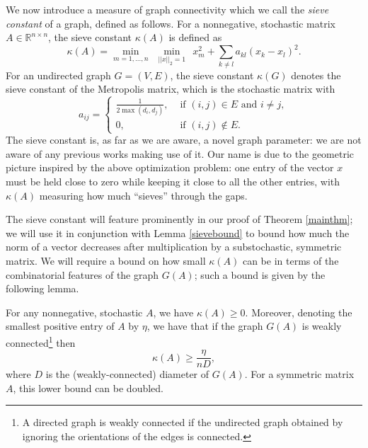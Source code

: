 \documentclass[final]{siamltex}
\begin{document}
\bigskip We now introduce a measure of graph connectivity which we call the {\em sieve constant} of a graph, defined as follows. For a nonnegative, stochastic matrix $A \in {\mathbb{R}}^{n \times n}$, the sieve constant $\kappa(A)$ is defined as \[ \kappa(A) = \min_{m=1, \ldots, n} ~~\min_{||x||_2=1} ~~ x_m^2 + \sum_{k \neq l} a_{kl} (x_k - x_l)^2. \]  For an undirected graph $G=(V,E)$,  the sieve constant $\kappa(G)$ denotes the sieve constant of the Metropolis matrix, which is the stochastic matrix with
 \begin{equation*}
a_{ij} =
\begin{cases} \frac{1}{2 \max(d_i, d_j)}, & \text{ if } (i,j) \in E \mbox{ and } i \neq j,\\
0, &\text{ if } (i,j) \notin E. 
\end{cases}
\end{equation*} The sieve constant is, as far as we are aware, a novel graph parameter: we are not aware of any previous works making use of it. Our name is due to the geometric picture inspired by the above optimization problem: one entry of the vector $x$ must be held close to zero while keeping it close to all the other entries, with $\kappa(A)$ measuring how much ``sieves'' through the gaps. 

\smallskip

The sieve constant will feature prominently in our proof of Theorem \ref{mainthm}; we will use it in conjunction with Lemma \ref{sievebound} to bound 
how much the norm of a vector decreases after multiplication by a substochastic, symmetric matrix. We will require a bound on how small $\kappa(A)$ can be
in terms of the combinatorial features of the graph $G(A)$; such a bound is given by the following lemma. 

\smallskip

\begin{lemma} \label{lemma:snonnegativity} For any nonnegative, stochastic $A$, we have $\kappa(A) \geq 0$. Moreover, denoting the smallest positive entry of $A$ by $\eta$, we have that if the graph $G(A)$ is weakly connected\footnote{A directed
graph is weakly connected if the undirected graph obtained by ignoring the orientations of the edges is connected.} then $$\kappa(A) \geq \frac{\eta}{n D },$$ where $D$ is the (weakly-connected) diameter of $G(A)$.  For a symmetric matrix $A$, this lower bound can be doubled. 
\end{lemma}

\smallskip
\end{document}
